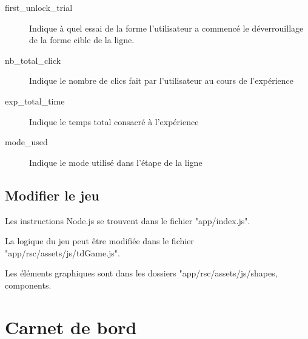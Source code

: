 \documentclass[a4paper, 12pt]{report}
\begin{document}
\begin{description}
            \item[first\_unlock\_trial] Indique à quel essai de la forme l'utilisateur a commencé le déverrouillage de la forme cible de la ligne.
            \item[nb\_total\_click] Indique le nombre de clics fait par l'utilisateur au cours de l'expérience
            \item[exp\_total\_time] Indique le temps total consacré à l'expérience
            \item[mode\_used] Indique le mode utilisé dans l'étape de la ligne
        \end{description}
        
    	\section{Modifier le jeu}
    	Les instructions Node.js se trouvent dans le fichier "app/index.js".
    	
    	La logique du jeu peut être modifiée dans le fichier "app/rsc/assets/js/tdGame.js".
    	
    	Les éléments graphiques sont dans les dossiers "app/rsc/assets/js/{shapes, components}.
    	
    	
    	\chapter{Carnet de bord}
    	
\end{document}
